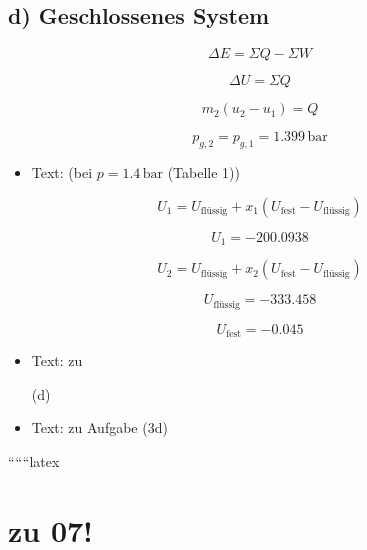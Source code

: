 \subsection*{d) Geschlossenes System}

\[
\Delta E = \Sigma Q - \Sigma W
\]

\[
\Delta U = \Sigma Q
\]

\[
m_2 (u_2 - u_1) = Q
\]

\[
p_{g,2} = p_{g,1} = 1.399 \, \text{bar}
\]

\begin{itemize}
    \item Text: (bei $p = 1.4 \, \text{bar}$ (Tabelle 1))
\end{itemize}

\[
U_1 = U_\text{flüssig} + x_1 (U_\text{fest} - U_\text{flüssig})
\]

\[
U_1 = -200.0938
\]

\[
U_2 = U_\text{flüssig} + x_2 (U_\text{fest} - U_\text{flüssig})
\]

\[
U_\text{flüssig} = -333.458
\]

\[
U_\text{fest} = -0.045
\]

\begin{itemize}
    \item Text: zu

(d)
    \item Text: zu Aufgabe (3d)
\end{itemize}

``````latex


\section*{zu 07!}
